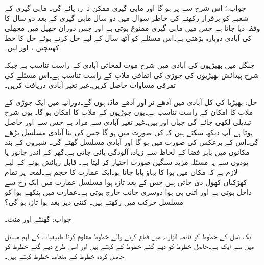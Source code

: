 جواب:؛ اس شرح سے  پر  ہو گا اور ماہی گیری ممکن نہ رہ پائے گی۔
ماہی گیری کے شعبے کو برقرار رکھنے کی خاطر سوال  میں دو سال ماہی گیری کے بعد دو سال کا وقفہ دیا جاتا ہے جس میں ماہی گیری ممنوع ہوتی ہے اور جس دوران جھیل میں مچھلی کی آبادی دوبارہ بڑھتی ہے۔اس مسئلے کو آٹھ سال کے لیے حل کرتے ہوئے حل کا خط کھینچیں۔،  اور  لیں۔
  

جنگل میں بھیڑیوں کی آبادی میں شرح موت لمحاتی آبادی کے راست تناسب ہے جبکہ شرح پیدائش بھیڑیوں کی جوڑی کی  اتفاقی ملاپ کے راست تناسب ہے۔اس مسئلے کی تفرقی مساوات حاصل کریں۔غیر تغیر آبادی دریافت کریں۔

 حل: بھیڑیا کی کل آبادی  میں آدھے نر اور آدھے مادَہ ہوں گے۔دورانیہ  میں ایک جوڑی کے ملاپ کا امکان   کے راست تناسب ہے۔یوں  جوڑیوں کے ملاپ کا امکان  ہو گا۔ یوں شرح تبدیلی  لکھی جائے گی جہاں  اور  ہیں۔غیر تغیر آبادی سے مراد  ہے  جس سے  اور  حاصل ہوتا ہے۔آپ دیکھ سکتے ہیں کہ  کی صورت میں  ہو گا جس کی بنا آبادی مسلسل بڑھے گی۔اس کے برعکس  کی صورت میں  ہو گا اور آبادی مسلسل گھٹے گی۔
شہروں کے بند مکانوں میں باہر فضا  کے لحاظ سے  زیادہ  آلودگی پائی جاتی ہے۔گھر کے اندر جانور یا پودوں سے یہ مسئلہ مزید سنگین صورت اختیار کر لیتا ہے۔ قابل رہائش ہونے کے لیے لازم ہے کہ مکان میں ہوا کا بہاؤ پایا جاتا ہو۔ایک عمارت کا حجم  ہے۔لمحہ  پر تمام کھڑکیاں کھول دی جاتی ہیں جس کے بعد
   تازہ ہوا مسلسل عمارت میں ایک رخ سے داخل ہوتی ہے اور اتنی ہی ہوا دوسری جانب خارج ہوتی ہے۔عمارت میں پنکھے ہوا کو مسلسل حرکت میں رکھتے ہیں۔ کتنی دیر بعد  ہوا تازہ ہو گی؟

جواب: گھنٹے اور  منٹ۔

ایک نسل کے خطوط کو قائمہ الزاویہ میں  قطع کرنے والے خطوط معلوم کرنا طبیعیات کے اہم مسائل میں سے ایک ہے۔حاصل خطوط کو دیے گئے خطوط کے    کہتے ہیں اور اسی طرح دیے گئے خطوط کو حاصل کردہ خطوط کے متعامد  خطوط کہتے ہیں۔

